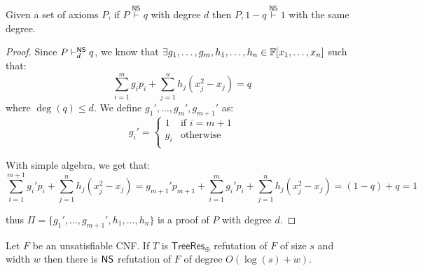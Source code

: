 \begin{lemma}
    \label{refutation_with_negation}
 Given a set of axioms $P$, if $P \stackrel{\mathsf{NS}}{\vdash} q$ with degree $d$ then $P, 1-q \stackrel{\mathsf{NS}}{\vdash} 1$ with the same degree. 
\end{lemma}

\begin{proof}
    
 Since $P \vdash^{\mathsf{NS}}_d q$, we know that $\exists g_1, \ldots, g_m, h_1, \ldots, h_n \in \mathbb{F}[x_1, \ldots, x_n]$ such that:
    \[\sum_{i = 1}^m g_i p_i + \sum_{j = 1}^n h_j (x_j^2-x_j) = q\]
 where $\deg(q) \leq d$. We define $g_1', \ldots, g_m', g_{m+1}'$ as:
    \[g_i' = \left \{ \begin{array}{ll}
        1 & \text{if } i = m+1 \\
 g_i & \text{otherwise}  \\
    \end{array}\right .\]
    
 With simple algebra, we get that:
    \[\sum_{i = 1}^{m+1} g_i' p_i + \sum_{j = 1}^n h_j (x_j^2-x_j) = g_{m+1}'p_{m+1} + \sum_{i = 1}^{m} g_i' p_i + \sum_{j = 1}^n h_j (x_j^2-x_j) = (1-q) + q = 1\]
    
 thus $\Pi = \{g_1', \ldots, g_{m+1}', h_1, \ldots, h_n\}$ is a proof of $P$ with degree $d$.

\end{proof}

\begin{theorem}
    \label{main_thm}
 Let $F$ be an unsatisfiable CNF. If $T$ is $\mathsf{TreeRes}_\oplus$ refutation of $F$ of size $s$ and width $w$ then there is $\mathsf{NS}$ refutation of $F$ of degree $O(\log(s)+w)$.
\end{theorem}

